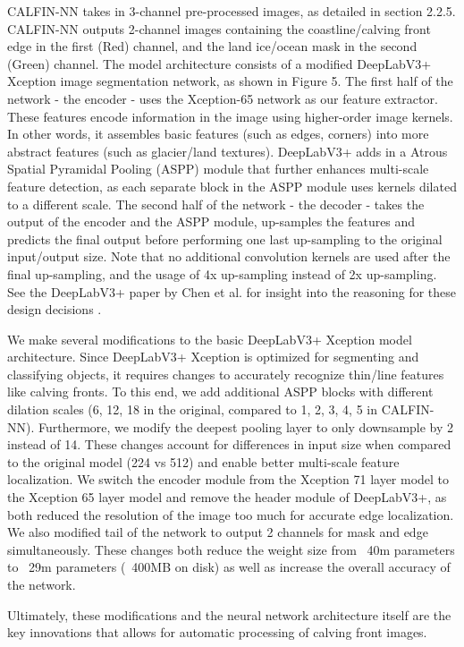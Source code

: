 \documentclass[tc, manuscript]{copernicus}
\begin{document}
CALFIN-NN takes in 3-channel pre-processed images, as detailed in section 2.2.5.
CALFIN-NN outputs 2-channel images containing the coastline/calving front edge in the first (Red) channel, and the land ice/ocean mask in the second (Green) channel.
The model architecture consists of a modified DeepLabV3+ Xception image segmentation network, as shown in Figure 5. 
The first half of the network - the encoder - uses the Xception-65 network \citep{chollet2016} as our feature extractor. These features encode information in the image using higher-order image kernels. In other words, it assembles basic features (such as edges, corners) into more abstract features (such as glacier/land textures). DeepLabV3+ adds in a Atrous Spatial Pyramidal Pooling (ASPP) module that further enhances multi-scale feature detection, as each separate block in the ASPP module uses kernels dilated to a different scale. 
The second half of the network - the decoder - takes the output of the encoder and the ASPP module, up-samples the features and predicts the final output before performing one last up-sampling to the original input/output size. Note that no additional convolution kernels are used after the final up-sampling, and the usage of 4x up-sampling instead of 2x up-sampling. See the DeepLabV3+ paper by Chen et al. for insight into the reasoning for these design decisions \citep{chen2018}.

We make several modifications to the basic DeepLabV3+ Xception model architecture. Since DeepLabV3+ Xception is optimized for segmenting and classifying objects, it requires changes to accurately recognize thin/line features like calving fronts. To this end, we add additional ASPP blocks with different dilation scales (6, 12, 18 in the original, compared to 1, 2, 3, 4, 5 in CALFIN-NN). Furthermore, we modify the deepest pooling layer to only downsample by 2 instead of 14. These changes account for differences in input size when compared to the original model (224 vs 512) and enable better multi-scale feature localization. We switch the encoder module from the Xception 71 layer model to the Xception 65 layer model and remove the header module of DeepLabV3+, as both reduced the resolution of the image too much for accurate edge localization. We also modified tail of the network to output 2 channels for mask and edge simultaneously. These changes both reduce the weight size from ~40m parameters to ~29m parameters (~400MB on disk) as well as increase the overall accuracy of the network.

Ultimately, these modifications and the neural network architecture itself are the key innovations that allows for automatic processing of calving front images.
\end{document}
